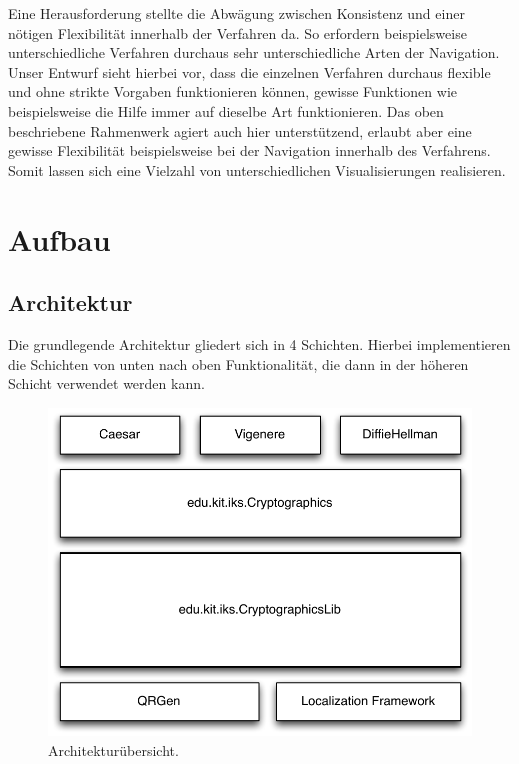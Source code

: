 \documentclass{article}
\begin{document}
Eine Herausforderung stellte die Abwägung zwischen Konsistenz und einer nötigen Flexibilität innerhalb der Verfahren da. So erfordern beispielsweise unterschiedliche Verfahren durchaus sehr unterschiedliche Arten der Navigation. Unser Entwurf sieht hierbei vor, dass die einzelnen Verfahren durchaus flexible und ohne strikte Vorgaben funktionieren können, gewisse Funktionen wie beispielsweise die Hilfe immer auf dieselbe Art funktionieren. Das oben beschriebene Rahmenwerk agiert auch hier unterstützend, erlaubt aber eine gewisse Flexibilität beispielsweise bei der Navigation innerhalb des Verfahrens. Somit lassen sich eine Vielzahl von unterschiedlichen Visualisierungen realisieren.

\section{Aufbau}

\subsection{Architektur}

Die grundlegende Architektur gliedert sich in 4 Schichten. Hierbei implementieren die Schichten von unten nach oben Funktionalität, die dann in der höheren Schicht verwendet werden kann.

\begin{figure}[H]
  \centering
    \includegraphics[width=\textwidth]{resources/architecture}
  \caption{Architekturübersicht.}
\end{figure}
\end{document}
